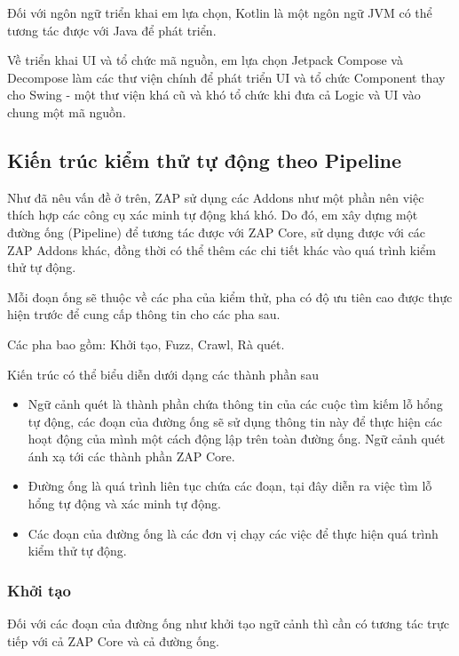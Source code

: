 \documentclass[./../main.tex]{subfiles}
\begin{document}
Đối với ngôn ngữ triển khai em lựa chọn, Kotlin là một ngôn ngữ JVM có thể tương tác được với Java để phát triển.

Về triển khai UI và tổ chức mã nguồn, em lựa chọn Jetpack Compose và Decompose làm các thư viện chính để phát triển UI và tổ chức Component thay cho Swing - một thư viện khá cũ và khó tổ chức khi đưa cả Logic và UI vào chung một mã nguồn.

\subsection{Kiến trúc kiểm thử tự động theo Pipeline}
Như đã nêu vấn đề ở trên, ZAP sử dụng các Addons như một phần nên việc thích hợp các công cụ xác minh tự động khá khó. Do đó, em xây dựng một đường ống (Pipeline) để tương tác được với ZAP Core, sử dụng được với các ZAP Addons khác, đồng thời có thể thêm các chi tiết khác vào quá trình kiểm thử tự động.

Mỗi đoạn ống sẽ thuộc về các pha của kiểm thử, pha có độ ưu tiên cao được thực hiện trước để cung cấp thông tin cho các pha sau.

Các pha bao gồm: Khởi tạo, Fuzz, Crawl, Rà quét.

Kiến trúc có thể biểu diễn dưới dạng các thành phần sau
\begin{itemize}
	\item Ngữ cảnh quét là thành phần chứa thông tin của các cuộc tìm kiếm lỗ hổng tự động, các đoạn của đường ống sẽ sử dụng thông tin này để thực hiện các hoạt động của mình một cách động lập trên toàn đường ống. Ngữ cảnh quét ánh xạ tới các thành phần ZAP Core.
	\item Đường ống là quá trình liên tục chứa các đoạn, tại đây diễn ra việc tìm lỗ hổng tự động và xác minh tự động.
	\item Các đoạn của đường ống là các đơn vị chạy các việc để thực hiện quá trình kiểm thử tự động.
\end{itemize}

\subsubsection{Khởi tạo}

Đối với các đoạn của đường ống như khởi tạo ngữ cảnh thì cần có tương tác trực tiếp với cả ZAP Core và cả đường ống.
\end{document}
